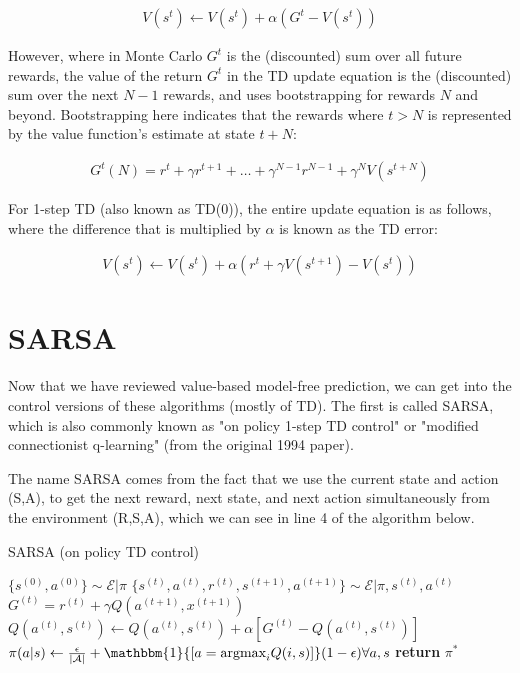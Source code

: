 \documentclass[11pt]{article}
\def\ind{\mathbbm{1}}
\begin{document}
\begin{align}
\label{eq:3}
    V(s^t) \leftarrow V(s^t) + \alpha (G^t - V(s^t))
\end{align}

However, where in Monte Carlo $G^t$ is the (discounted) sum over all future rewards, the value of the return $G^t$ in the TD update equation is the (discounted) sum over the next $N-1$ rewards, and uses bootstrapping for rewards $N$ and beyond. Bootstrapping here indicates that the rewards where $t > N$ is represented by the value function's estimate at state $t+N$:

\begin{align}
\label{eq:4}
    G^t(N) = r^t + \gamma r^{t+1} + \dots + \gamma^{N-1}r^{N-1} + \gamma^NV(s^{t+N})
\end{align}

For 1-step TD (also known as TD(0)), the entire update equation is as follows, where the difference that is multiplied by $\alpha$ is known as the TD error:

\begin{align}
\label{eq:5}
    V(s^t) \leftarrow V(s^t) + \alpha (r^t + \gamma V(s^{t+1}) - V(s^t))
\end{align}



\section{SARSA}

Now that we have reviewed value-based model-free prediction, we can get into the control versions of these algorithms (mostly of TD). The first is called SARSA, which is also commonly known as "on policy 1-step TD control" or "modified connectionist q-learning" (from the original 1994 paper). 

The name SARSA comes from the fact that we use the current state and action (S,A), to get the next reward, next state, and next action simultaneously from the environment (R,S,A), which we can see in line 4 of the algorithm below.


\begin{algorithm}[H]
\caption{SARSA (on policy TD control)}
\label{algo:Sarsa}
\begin{algorithmic}[1]
\STATE $\{s^{(0)},a^{(0)}\} \sim \mathcal{E}|\pi$ \hfill
{}
\STATE $\{s^{(t)},a^{(t)},r^{(t)},s^{(t+1)},a^{(t+1)}\} \sim \mathcal{E}|\pi, s^{(t)},a^{(t)}$ \hfill
\STATE $G^{(t)} = r^{(t)} + \gamma Q(a^{(t+1)},x^{(t+1)})$ 
\STATE $Q(a^{(t)},s^{(t)}) \leftarrow Q(a^{(t)},s^{(t)}) + \alpha[G^{(t)} - Q(a^{(t)},s^{(t)})]$ \hfill
\STATE $\pi(a|s) \leftarrow \frac{\epsilon}{|\mathcal{A}|} + \ind{[a = \text{argmax}_i Q(i,s)]} (1 - \epsilon) \forall{a,s}$  \hfill
\ENDFOR
\ENDFOR
\STATE \textbf{return} $\pi^*$ \hfill
\end{algorithmic}
\end{algorithm}
\end{document}
